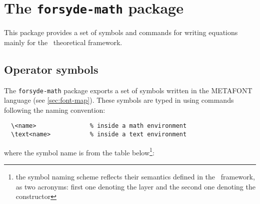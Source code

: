 \vfill
\begin{figure}[htb]\centering
  {%
    \setlength{\fboxsep}{7pt}%
    \setlength{\fboxrule}{1pt}%
  }
\end{figure}

\vfill
\newpage

\section{The \texttt{forsyde-math} package}
\label{sec:forsyde-math-package}

This package provides a set of symbols and commands for writing equations mainly for the \ForSyDeAtom\ theoretical framework.

\subsection{Operator symbols}
\label{sec:fonts}

The \texttt{forsyde-math} package exports a set of symbols written in the \textsc{METAFONT} language (see \ref{sec:font-map}). These symbols are typed in using commands following the naming convention:

\begin{verbatim}
  \<name>               % inside a math environment
  \text<name>           % inside a text environment
\end{verbatim}

\noindent where the symbol name is from the table below\footnote{the symbol naming scheme reflects their semantics defined in the \ForSyDeAtom\ framework, as two acronyms: first one denoting the layer and the second one denoting the constructor}:

